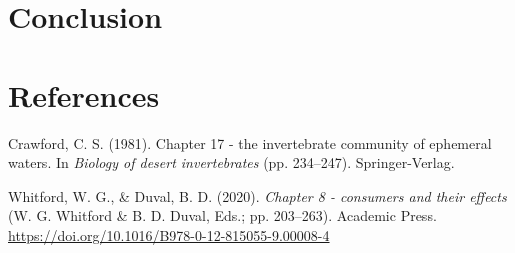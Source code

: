 \documentclass[
]{agujournal2019}
\newlength{\cslhangindent}
\newenvironment{CSLReferences}[2] %
 {\begin{list}{}{%
  \setlength{\itemindent}{0pt}
  \setlength{\leftmargin}{0pt}
  \setlength{\parsep}{0pt}
  \ifodd #1
   \setlength{\leftmargin}{\cslhangindent}
   \setlength{\itemindent}{-1\cslhangindent}
  \fi
  \setlength{\itemsep}{#2\baselineskip}}}
 {\end{list}}
\begin{document}
\section{Conclusion}\label{conclusion}

\section*{References}\label{references}

\label{refs}
\begin{CSLReferences}{1}{0}
\vspace{1em}

Crawford, C. S. (1981). Chapter 17 - the invertebrate community of
ephemeral waters. In \emph{Biology of desert invertebrates} (pp.
234--247). Springer-Verlag.

Whitford, W. G., \& Duval, B. D. (2020). \emph{Chapter 8 - consumers and
their effects} (W. G. Whitford \& B. D. Duval, Eds.; pp. 203--263).
Academic Press. \url{https://doi.org/10.1016/B978-0-12-815055-9.00008-4}

\end{CSLReferences}
\end{document}
